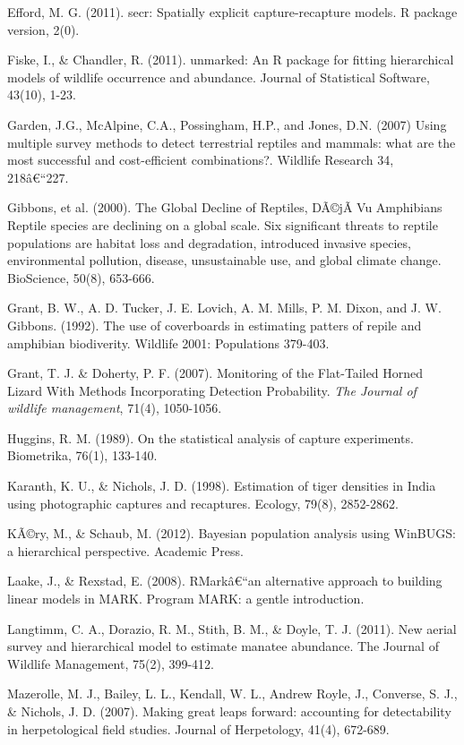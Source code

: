 \documentclass{book}
\begin{document}
\rf Efford, M. G. (2011). secr: Spatially explicit capture-recapture models. R package version, 2(0).

\rf Fiske, I., \& Chandler, R. (2011). unmarked: An R package for fitting hierarchical models of wildlife occurrence and abundance. Journal of Statistical Software, 43(10), 1-23.

\rf Garden, J.G., McAlpine, C.A., Possingham, H.P., and Jones, D.N. (2007) Using multiple survey methods to detect terrestrial reptiles and mammals: what are the most successful and cost-efficient combinations?. Wildlife Research 34, 218â€“227.

\rf Gibbons, et al. (2000). The Global Decline of Reptiles, DÃ©jÃ  Vu Amphibians Reptile species are declining on a global scale. Six significant threats to reptile populations are habitat loss and degradation, introduced invasive species, environmental pollution, disease, unsustainable use, and global climate change. BioScience, 50(8), 653-666.

\rf Grant, B. W., A. D. Tucker, J. E. Lovich, A. M. Mills, P. M. Dixon, and J. W. Gibbons. (1992). The use of coverboards in estimating patters of repile and amphibian biodiverity. Wildlife 2001: Populations 379-403.

Grant, T. J. \& Doherty, P. F. (2007). Monitoring of the Flat-Tailed Horned Lizard With Methods Incorporating Detection Probability. \textit{The Journal of wildlife management}, 71(4), 1050-1056.

\rf Huggins, R. M. (1989). On the statistical analysis of capture experiments. Biometrika, 76(1), 133-140.

\rf  Karanth, K. U., \& Nichols, J. D. (1998). Estimation of tiger densities in India using photographic captures and recaptures. Ecology, 79(8), 2852-2862.

\rf KÃ©ry, M., \& Schaub, M. (2012). Bayesian population analysis using WinBUGS: a hierarchical perspective. Academic Press.

\rf Laake, J., \& Rexstad, E. (2008). RMarkâ€“an alternative approach to building linear models in MARK. Program MARK: a gentle introduction.

\rf Langtimm, C. A., Dorazio, R. M., Stith, B. M., \& Doyle, T. J. (2011). New aerial survey and hierarchical model to estimate manatee abundance. The Journal of Wildlife Management, 75(2), 399-412.

\rf Mazerolle, M. J., Bailey, L. L., Kendall, W. L., Andrew Royle, J., Converse, S. J., \& Nichols, J. D. (2007). Making great leaps forward: accounting for detectability in herpetological field studies. Journal of Herpetology, 41(4), 672-689.
\end{document}
